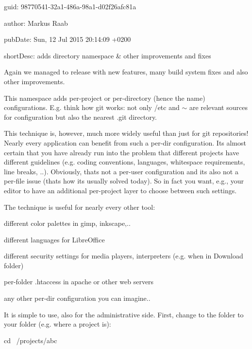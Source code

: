 
\begin{DoxyItemize}
\item guid\+: 98770541-\/32a1-\/486a-\/98a1-\/d02f26afc81a
\item author\+: Markus Raab
\item pub\+Date\+: Sun, 12 Jul 2015 20\+:14\+:09 +0200
\item short\+Desc\+: adds directory namespace \& other improvements and fixes
\end{DoxyItemize}

Again we managed to release with new features, many build system fixes and also other improvements.

This namespace adds per-\/project or per-\/directory (hence the name) configurations. E.\+g. think how git works\+: not only /etc and $\sim$ are relevant sources for configuration but also the nearest .git directory.

This technique is, however, much more widely useful than just for git repositories! Nearly every application can benefit from such a per-\/dir configuration. Its almost certain that you have already run into the problem that different projects have different guidelines (e.\+g. coding conventions, languages, whitespace requirements, line breaks, ..). Obviously, thats not a per-\/user configuration and its also not a per-\/file issue (thats how its usually solved today). So in fact you want, e.\+g., your editor to have an additional per-\/project layer to choose between such settings.

The technique is useful for nearly every other tool\+:


\begin{DoxyItemize}
\item different color palettes in gimp, inkscape,..
\item different languages for Libre\+Office
\item different security settings for media players, interpreters (e.\+g. when in Download folder)
\item per-\/folder .htaccess in apache or other web servers
\item any other per-\/dir configuration you can imagine..
\end{DoxyItemize}

It is simple to use, also for the administrative side. First, change to the folder to your folder (e.\+g. where a project is)\+:


\begin{DoxyCode}
cd ~/projects/abc
\end{DoxyCode}


